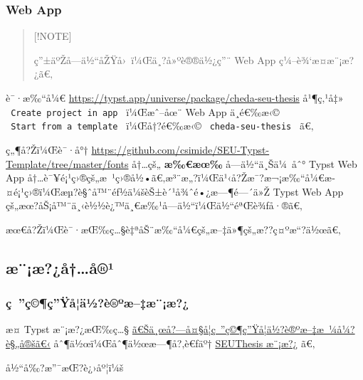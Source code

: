 \subsubsection{Web App}\label{web-app}

\begin{quote}
{[}!NOTE{]}

ç''±äºŽå­---ä½``åŽŸå›~ï¼Œä¸?å»ºè®®ä½¿ç''¨ Web App ç¼--è¾`æ­¤æ¨¡æ?¿ã€‚
\end{quote}

è¯·æ‰``å¼€ \url{https://typst.app/universe/package/cheda-seu-thesis}
å¹¶ç‚¹å‡» \texttt{\ Create\ project\ in\ app\ } ï¼Œæˆ--åœ¨ Web App
ä¸­é€‰æ‹© \texttt{\ Start\ from\ a\ template\ } ï¼Œå†?é€‰æ‹©
\texttt{\ cheda-seu-thesis\ } ã€‚

ç„¶å?Žï¼Œè¯·å°†
\url{https://github.com/csimide/SEU-Typst-Template/tree/master/fonts}
å†\ldots çš„ \textbf{æ‰€æœ‰} å­---ä½``ä¸Šä¼~åˆ° Typst Web App
å†\ldots è¯¥é¡¹ç›®çš„æ~¹ç›®å½•ã€‚æ³¨æ„?ï¼Œä¹‹å?Žæ¯?æ¬¡æ‰``å¼€æ­¤é¡¹ç›®ï¼Œæµ?è§ˆå™¨éƒ½ä¼šèŠ±è´¹å¾ˆé•¿æ---¶é---´ä»Ž
Typst Web App çš„æœ?åŠ¡å™¨ä¸‹è½½è¿™ä¸€æ‰¹å­---ä½``ï¼Œä½``éªŒè¾ƒå·®ã€‚

æœ€å?Žï¼Œè¯·æŒ‰ç\ldots§è‡ªåŠ¨æ‰``å¼€çš„æ--‡ä»¶çš„æ??ç¤ºæ``?ä½œã€‚

\subsection{æ¨¡æ?¿å†\ldots å®¹}\label{uxe6uxe6uxe5uxe5uxb9}

\subsubsection{ç~''ç©¶ç''Ÿå­¦ä½?è®ºæ--‡æ¨¡æ?¿}\label{uxe7-uxe7uxe7uxffuxe5uxe4uxbduxe8uxbauxe6uxe6uxe6}

æ­¤ Typst æ¨¡æ?¿æŒ‰ç\ldots§
\href{https://seugs.seu.edu.cn/2023/0424/c26669a442680/page.htm}{ã€Šä¸œå?---å¤§å­¦ç~''ç©¶ç''Ÿå­¦ä½?è®ºæ--‡æ~¼å¼?è§„å®šã€‹}
åˆ¶ä½œï¼Œåˆ¶ä½œæ---¶å?‚è€ƒäº†
\href{https://ctan.math.utah.edu/ctan/tex-archive/macros/latex/contrib/seuthesis/seuthesis.pdf}{SEUThesis
æ¨¡æ?¿} ã€‚

å½``å‰?æ''¯æŒ?è¿›åº¦ï¼š

